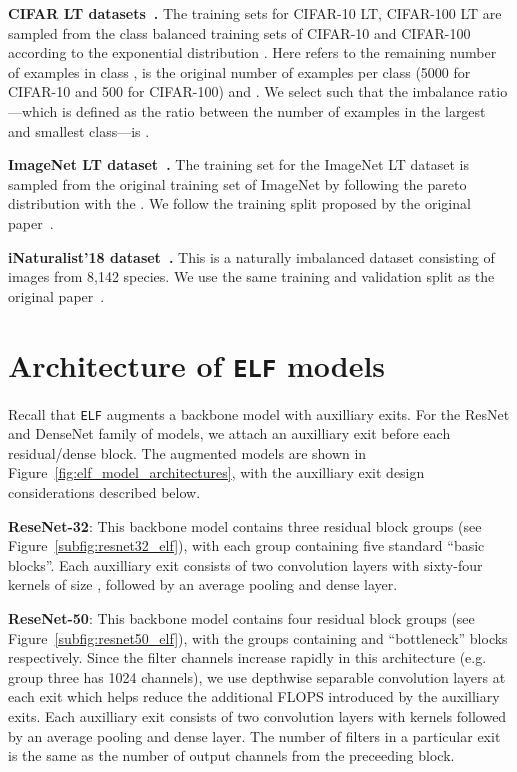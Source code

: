 \documentclass{article}
\newcommand{\method}{\texttt{ELF}\xspace}
\begin{document}
\textbf{CIFAR LT datasets~\cite{cui2019class}.}
The training sets for CIFAR-10 LT, CIFAR-100 LT are sampled from the class balanced training sets of CIFAR-10 and CIFAR-100 according to the exponential distribution . Here  refers to the remaining number of examples in class ,  is the original number of examples per class (5000 for CIFAR-10 and 500 for CIFAR-100) and . 
We select  such that the imbalance ratio---which is defined as the ratio between the number of examples in the largest and smallest class---is .

\textbf{ImageNet LT dataset~\cite{liu2019large}.}
The training set for the ImageNet LT dataset is sampled from the original training set of ImageNet by following the pareto distribution with the . 
We follow the training split proposed by the original paper~\cite{liu2019large}.

\textbf{iNaturalist'18 dataset~\cite{van2018inaturalist}.}
This is a naturally imbalanced dataset consisting of images from 8,142 species. 
We use the same training and validation split as the original paper~\cite{van2018inaturalist}.

\section{Architecture of \method{} models}

Recall that \method{} augments a backbone model with auxilliary exits. For the ResNet and DenseNet family of models, we attach an auxilliary exit before each residual/dense block. 
The augmented models are shown in Figure~\ref{fig:elf_model_architectures}, with the auxilliary exit design considerations described below.
 
\textbf{ReseNet-32}: This backbone model contains three residual block groups (see Figure~\ref{subfig:resnet32_elf}), with each group containing five standard ``basic blocks''. 
 Each auxilliary exit consists of two convolution layers with sixty-four kernels of size , followed by an average pooling and dense layer. 
 
 
\textbf{ReseNet-50}: This backbone model contains four residual block groups (see Figure~\ref{subfig:resnet50_elf}), with the groups containing  and  ``bottleneck'' blocks respectively. Since the filter channels increase rapidly in this architecture (e.g. group three has 1024 channels), we use depthwise separable convolution layers at each exit which helps reduce the additional FLOPS introduced by the auxilliary exits. 
Each auxilliary exit consists of two convolution layers with  kernels followed by an average pooling and dense layer. The number of filters in a particular exit is the same as the number of output channels from the preceeding block.
 
\end{document}
